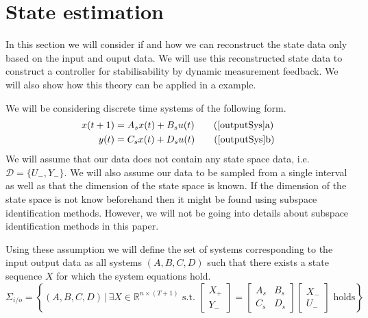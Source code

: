 \section{State estimation}
In this section we will consider if and how we can reconstruct the state data only based on the input and ouput data. We will use this reconstructed state data to construct a controller for stabilisability by dynamic measurement feedback. We will also show how this theory can be applied in a example.



We will be considering discrete time systems of the following form.
\begin{subequations}
	\begin{align} 
	x(t+1) &= A_s x(t) + B_s u(t) \tag{\ref{outputSys}a} \\
	y(t)   &= C_s x(t) + D_s u(t) \tag{\ref{outputSys}b}
	\end{align}
\end{subequations}
We will assume that our data does not contain any state space data, i.e. $\mathcal{D} = \{ U_-,Y_- \}$. We will also assume our data to be sampled from a single interval as well as that the dimension of the state space is known. If the dimension of the state space is not know beforehand then it might be found using subspace identification methods. However, we will not be going into details about subspace identification methods in this paper.

Using these assumption we will define the set of systems corresponding to the input output data as all systems $(A,B,C,D)$ such that there exists a state sequence $X$ for which the system equations hold. %
\begin{equation*}
	\Sigma_{i/o} = \left\{ (A,B,C,D) \, | \, \exists X \in \mathbb{R}^{n \times (T+1)} \mbox{ s.t. } \begin{bmatrix} X_{+} \\ Y_{-} \end{bmatrix} = \begin{bmatrix} A_s & B_s \\ C_s & D_s \end{bmatrix} \begin{bmatrix} X_{-} \\ U_{-} \end{bmatrix} \mbox{ holds} \right\}
\end{equation*}

